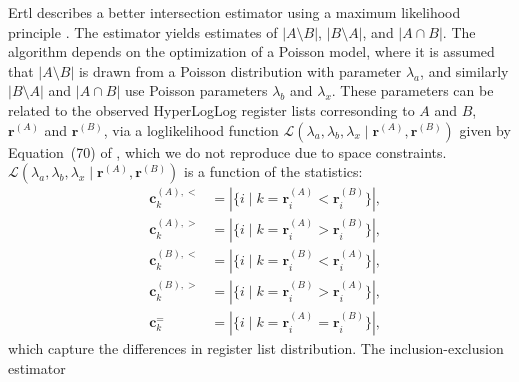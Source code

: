 \documentclass{vldb}
\begin{document}
Ertl describes a better intersection estimator using a maximum likelihood principle \cite{ertl2017new}.
The estimator yields estimates of $|A \setminus B|$, $|B \setminus A|$, and $|A \cap B|$. 
The algorithm depends on the optimization of a Poisson model, where it is assumed that $|A \setminus B|$ is drawn from a Poisson distribution with parameter $\lambda_a$, and similarly $|B \setminus A|$ and $|A \cap B|$ use Poisson parameters $\lambda_b$ and $\lambda_x$. These parameters can be related to the observed HyperLogLog register lists corresonding to $A$ and $B$, $\mathbf{r}^{(A)}$ and $\mathbf{r}^{(B)}$, via a loglikelihood function $\mathcal{L}(\lambda_a, \lambda_b, \lambda_x \mid \mathbf{r}^{(A)}, \mathbf{r}^{(B)})$ given by Equation~(70) of \cite{ertl2017new}, which we do not reproduce due to space constraints.
$\mathcal{L}(\lambda_a, \lambda_b, \lambda_x \mid \mathbf{r}^{(A)}, \mathbf{r}^{(B)})$ is a function of the statistics:
%
\begin{equation} \label{eq:cs}
	\begin{alignedat}{2}
		&\mathbf{c}^{(A),<}_k &= |\{i \mid k = \mathbf{r}^{(A)}_i < \mathbf{r}^{(B)}_i \}|, \\
		&\mathbf{c}^{(A),>}_k &= |\{i \mid k = \mathbf{r}^{(A)}_i > \mathbf{r}^{(B)}_i \}|, \\
		&\mathbf{c}^{(B),<}_k &= |\{i \mid k = \mathbf{r}^{(B)}_i < \mathbf{r}^{(A)}_i \}|, \\ 
		&\mathbf{c}^{(B),>}_k &= |\{i \mid k = \mathbf{r}^{(B)}_i > \mathbf{r}^{(A)}_i \}|, \\
		&\mathbf{c}^{=}_k &= |\{i \mid k = \mathbf{r}^{(A)}_i = \mathbf{r}^{(B)}_i \}|,
  \end{alignedat}
\end{equation} 
%
which capture the differences in register list distribution.
The inclusion-exclusion estimator 
\end{document}
